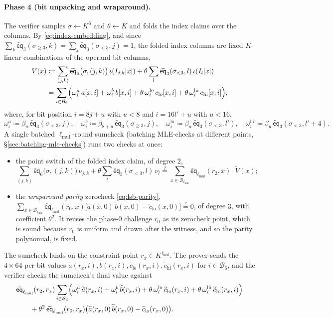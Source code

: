 \documentclass{article}
\theoremstyle{definition}
\newcommand*{\mle}{\widetilde}
\newcommand{\eq}{\mathsf{eq}}
\newcommand{\BB}{\mathcal{B}}
\begin{document}
\paragraph{Phase 4 (bit unpacking and wraparound).}
The verifier samples $\sigma \gets K^6$ and $\theta \gets K$ and folds the index claims over the columns. By \eqref{eq:index-embedding}, and since $\sum_k \mle{\eq}_3(\sigma_{\geq 3}, k) = \sum_j \mle{\eq}_3(\sigma_{< 3}, j) = 1$, the folded index columns are fixed $K$-linear combinations of the operand bit columns,
\begin{align*}
  V(x) &\coloneqq \sum_{(j, k)} \mle{\eq}_6\bigl( \sigma, (j, k) \bigr) \, \iota(I_{j, k}[x]) + \theta \sum_{l} \mle{\eq}_3(\sigma_{< 3}, l) \, \iota(I_l[x]) \\
  &= \sum_{i \in \BB_6} \Bigl( \omega^a_i \, a[x, i] + \omega^b_i \, b[x, i] + \theta \, \omega^\text{lo}_i \, c_\text{lo}[x, i] + \theta \, \omega^\text{hi}_i \, c_\text{hi}[x, i] \Bigr),
\end{align*}
where, for bit position $i = 8j + u$ with $u < 8$ and $i = 16 l' + u$ with $u < 16$,
\[
  \omega^a_i \coloneqq \beta_u \, \mle{\eq}_3(\sigma_{< 3}, j), \quad \omega^b_i \coloneqq \beta_{8 + u} \, \mle{\eq}_3(\sigma_{\geq 3}, j), \quad \omega^\text{lo}_i \coloneqq \beta_u \, \mle{\eq}_3(\sigma_{< 3}, l'), \quad \omega^\text{hi}_i \coloneqq \beta_u \, \mle{\eq}_3(\sigma_{< 3}, l' + 4).
\]
A single batched $\ell_\text{mul}$-round sumcheck (batching MLE-checks at different points, \S\ref{sec:batching-mle-checks}) runs two checks at once:
\begin{itemize}
\item the point switch of the folded index claim, of degree $2$,
\[
  \sum_{(j, k)} \mle{\eq}_6\bigl( \sigma, (j, k) \bigr) \, \nu_{j, k} + \theta \sum_l \mle{\eq}_3(\sigma_{< 3}, l) \, \nu_l \stackrel{?}{=} \sum_{x \in \BB_{\ell_\text{mul}}} \mle{\eq}_{\ell_\text{mul}}(r_2, x) \cdot \mle{V}(x);
\]
\item the \emph{wraparound parity} zerocheck \eqref{eq:lsb-parity}, $\sum_{x \in \BB_{\ell_\text{mul}}} \mle{\eq}_{\ell_\text{mul}}(r_0, x) \bigl[ \mle{a}(x, 0) \, \mle{b}(x, 0) - \mle{c}_\text{lo}(x, 0) \bigr] \stackrel{?}{=} 0$, of degree $3$, with coefficient $\theta^2$. It reuses the phase-$0$ challenge $r_0$ as its zerocheck point, which is sound because $r_0$ is uniform and drawn after the witness, and so the parity polynomial, is fixed.
\end{itemize}
The sumcheck lands on the constraint point $r_x \in K^{\ell_\text{mul}}$. The prover sends the $4 \times 64$ per-bit values $\mle{a}(r_x, i), \mle{b}(r_x, i), \mle{c}_\text{lo}(r_x, i), \mle{c}_\text{hi}(r_x, i)$ for $i \in \BB_6$, and the verifier checks the sumcheck's final value against
\begin{align*}
  &\mle{\eq}_{\ell_\text{mul}}(r_2, r_x) \sum_{i \in \BB_6} \Bigl( \omega^a_i \, \mle{a}(r_x, i) + \omega^b_i \, \mle{b}(r_x, i) + \theta \, \omega^\text{lo}_i \, \mle{c}_\text{lo}(r_x, i) + \theta \, \omega^\text{hi}_i \, \mle{c}_\text{hi}(r_x, i) \Bigr) \\
  &\qquad + \theta^2 \, \mle{\eq}_{\ell_\text{mul}}(r_0, r_x) \bigl( \mle{a}(r_x, 0) \, \mle{b}(r_x, 0) - \mle{c}_\text{lo}(r_x, 0) \bigr).
\end{align*}
\end{document}
